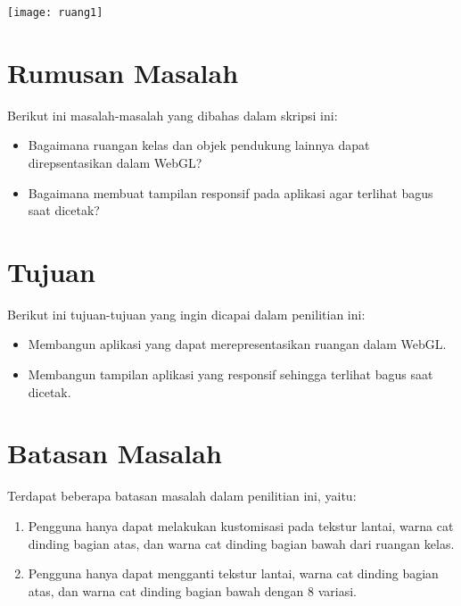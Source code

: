 \texttt{[image: ruang1]}

\section{Rumusan Masalah}
\label{sec:rumusan}
Berikut ini masalah-masalah yang dibahas dalam skripsi ini:
\begin{itemize}
    \item Bagaimana ruangan kelas dan objek pendukung lainnya dapat direpsentasikan dalam WebGL?
    \item Bagaimana membuat tampilan responsif pada aplikasi agar terlihat bagus saat dicetak?
\end{itemize}

\section{Tujuan}
\label{sec:tujuan}
Berikut ini tujuan-tujuan yang ingin dicapai dalam penilitian ini:
\begin{itemize}
    \item Membangun aplikasi yang dapat merepresentasikan ruangan dalam WebGL.
    \item Membangun tampilan aplikasi yang responsif sehingga terlihat bagus saat dicetak.
\end{itemize}

\section{Batasan Masalah}
\label{sec:batasan}
Terdapat beberapa batasan masalah dalam penilitian ini, yaitu:
\begin{enumerate}
    \item Pengguna hanya dapat melakukan kustomisasi pada tekstur lantai, warna cat dinding bagian atas, dan warna cat dinding bagian bawah dari ruangan kelas.
    \item Pengguna hanya dapat mengganti tekstur lantai, warna cat dinding bagian atas, dan warna cat dinding bagian bawah dengan 8 variasi.
\end{enumerate}
